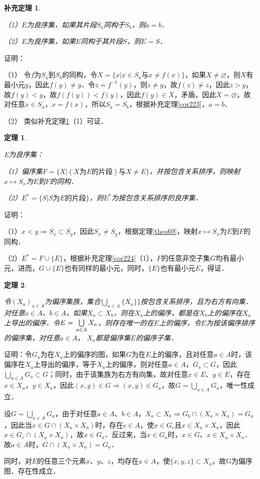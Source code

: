 \documentclass[12pt, a4paper, oneside]{book}
\newtheorem{theo}{定理}
\newtheorem{cor}{补充定理}
\begin{document}
			\begin{cor}\label{cor225}
				\hfill\par
				（1）$E$为良序集，如果其片段$S_a$同构于$S_b$，则$a=b$．
				\par
				（2）$E$为良序集，如果$E$同构于其片段$S$，则$E=S$．
			\end{cor}
			证明：
			\par
			（1）	令$f$为$S_a$到$S_b$的同构，令$X=\{x|x\in S_a\text{与}x\neq f(x)\}$，如果$X\neq \varnothing$，则$X$有最小元$y$，因此$f(y)\neq y$．令$z=f^{-1}(y)$，则$z\neq y$，故$f(z)\neq z$，因此$z>y$，故$f(y)<y$，故$f(f(y))<f(y)$，因此$f(y)\in X$，矛盾，因此$X=\varnothing$，故对任意$x\in S_a$，$x=f(x)$，所以$S_a=S_b$，根据补充定理\ref{cor223}，$a=b$．
			\par
			（2）	类似补充定理\ref{cor225}（1）可证．
			
			\begin{theo}\label{theo73}
				\hfill\par
				E为良序集：
				\par
				（1）偏序集$F=\{X|(X\text{为}E\text{的片段})\text{与}X\neq E\}$，并按包含关系排序，则映射$x\mapsto S_x$为$E$到$F$的同构．
				\par
				（2）$E^*=\{S|S\text{为}E\text{的片段}\}$，则$E^*$为按包含关系排序的良序集．
			\end{theo}
			证明：
			\par
			（1）$x<y\Rightarrow S_x\subset S_y$，因此$S_x\neq S_y$，根据定理\ref{theo69}，映射$x\mapsto S_x$为$E$到$F$的同构．
			\par
			（2）$E^*=F\cup\{E\}$，根据补充定理\ref{cor224}（1），$F$的任意非空子集$G$均有最小元，进而，$G\cup\{E\}$也有同样的最小元，同时，$\{E\}$也有最小元$E$，得证．
						
			\begin{theo}\label{theo74}
				\hfill\par
				令$(X_a)_{a\in A}$为偏序集族，集合$\bigcup\limits_{a\in A}\{X_a\}\}$按包含关系排序，且为右方有向集．对任意$a\in A$、$b\in A$，如果$X_a\subset X_b$，则在$X_a$上的偏序，都是在$X_b$上的偏序在$X_a$上导出的偏序．令$E=\\\bigcup\limits_{a\in A}X_a$，则存在唯一的在$E$上的偏序，令$E$为按该偏序排序的偏序集，对任意$a\in A$， $X_a$都是偏序集$E$的偏序子集．
			\end{theo}
			证明：令$G_a$为在$X_a$上的偏序的图，如果$G$为在$E$上的偏序，且对任意$a\in A$时，该偏序在$X_a$上导出的偏序，等于$X_a$上的偏序，则对任意$a\in A$，$G_a\subset G$，因此$\bigcup\limits_{a\in A}G_a\subset G$；同时，由于该集族为右方有向集，故对任意$x\in E$、$y\in E$，存在$x\in X_a$，$y\in X_a$，因此$(x, y)\in G\Rightarrow (x, y)\in G_a$，故$G=\bigcup\limits_{a\in A}G_a$，唯一性成立．
			\par
			设$G=\bigcup\limits_{a\in A}G_a$，由于对任意$a\in A$、$b\in A$，$X_a\subset X_b\Rightarrow G_b\cap (X_a\times X_a)=G_a$，因此当$x\in G\cap(X_a\times X_a)$时，存在$c\in A$，使$x\in G_c$且$x\in X_a\times X_a$，因此$x\in G_c\cap(X_a\times X_a)$，故$x\in G_a$．反过来，当$x\in G_a$时，$x\in G$、$x\in X_a\times X_a$．故$a\in A$时，$G\cap(X_a\times X_a)=G_a$．
			\par
			同时，对$E$的任意三个元素$x$、$y$、$z$，均存在$a\in A$，使$\{x, y, z\}\subset X_a$，故G为偏序图．存在性成立．
						
\end{document}
